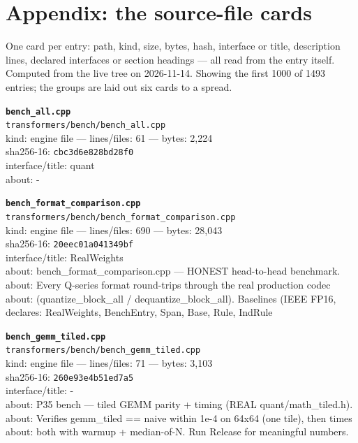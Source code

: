 \chapter{Appendix: the source-file cards}

One card per entry: path, kind, size, bytes, hash, interface or title, description
lines, declared interfaces or section headings --- all read from the entry itself.
Computed from the live tree on 2026-11-14. Showing the first 1000 of 1493 entries; the groups are laid
out six cards to a spread.

\setlength{\parskip}{7pt}
\noindent\textbf{\texttt{bench\_all.cpp}}\\
\texttt{transformers/bench/bench\_all.cpp}\\
kind: engine file --- lines/files: 61 --- bytes: 2,224\\
sha256-16: \texttt{cbc3d6e828bd28f0}\\
interface/title: quant\\
about: -\\
\vspace*{6.0pt}

\noindent\textbf{\texttt{bench\_format\_comparison.cpp}}\\
\texttt{transformers/bench/bench\_format\_comparison.cpp}\\
kind: engine file --- lines/files: 690 --- bytes: 28,043\\
sha256-16: \texttt{20eec01a041349bf}\\
interface/title: RealWeights\\
about: bench\_format\_comparison.cpp — HONEST head-to-head benchmark.\\
about: Every Q-series format round-trips through the real production codec\\
about: (quantize\_block\_all / dequantize\_block\_all). Baselines (IEEE FP16,\\
declares: RealWeights, BenchEntry, Span, Base, Rule, IndRule\\
\vspace*{6.0pt}

\noindent\textbf{\texttt{bench\_gemm\_tiled.cpp}}\\
\texttt{transformers/bench/bench\_gemm\_tiled.cpp}\\
kind: engine file --- lines/files: 71 --- bytes: 3,103\\
sha256-16: \texttt{260e93e4b51ed7a5}\\
interface/title: -\\
about: P35 bench — tiled GEMM parity + timing (REAL quant/math\_tiled.h).\\
about: Verifies gemm\_tiled == naive within 1e-4 on 64x64 (one tile), then times\\
about: both with warmup + median-of-N. Run Release for meaningful numbers.\\
\vspace*{6.0pt}

